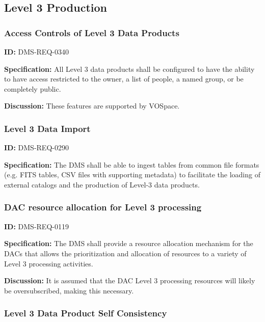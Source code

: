 \documentclass[SE,toc,lsstdraft]{lsstdoc}
\begin{document}
\subsection{Level 3 Production}





\subsubsection{Access Controls of Level 3 Data Products}

\label{DMS-REQ-0340}
\textbf{ID:} DMS-REQ-0340

\textbf{Specification:} All Level 3 data products shall be configured to have the ability to have access restricted to the owner, a list of people, a named group, or be completely public.

\textbf{Discussion:} These features are supported by VOSpace.





\subsubsection{Level 3 Data Import}

\label{DMS-REQ-0290}
\textbf{ID:} DMS-REQ-0290

\textbf{Specification:} The DMS shall be able to ingest tables from common file formats (e.g. FITS tables, CSV files with supporting metadata) to facilitate the loading of external catalogs and the production of Level-3 data products.






\subsubsection{DAC resource allocation for Level 3 processing}

\label{DMS-REQ-0119}
\textbf{ID:} DMS-REQ-0119

\textbf{Specification:} The DMS shall provide a resource allocation mechanism for the DACs that allows the prioritization and allocation of resources to a variety of Level 3 processing activities.

\textbf{Discussion:} It is assumed that the DAC Level 3 processing resources will likely be oversubscribed, making this necessary.




\subsubsection{Level 3 Data Product Self Consistency}
\end{document}
